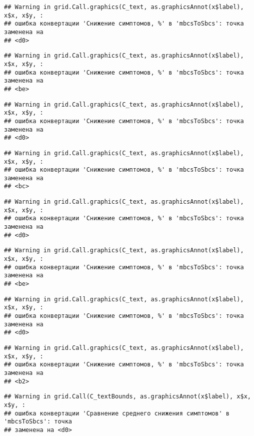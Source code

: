 \documentclass[
]{article}
\begin{document}
\begin{verbatim}
## Warning in grid.Call.graphics(C_text, as.graphicsAnnot(x$label), x$x, x$y, :
## ошибка конвертации 'Снижение симптомов, %' в 'mbcsToSbcs': точка заменена на
## <d0>
\end{verbatim}

\begin{verbatim}
## Warning in grid.Call.graphics(C_text, as.graphicsAnnot(x$label), x$x, x$y, :
## ошибка конвертации 'Снижение симптомов, %' в 'mbcsToSbcs': точка заменена на
## <be>
\end{verbatim}

\begin{verbatim}
## Warning in grid.Call.graphics(C_text, as.graphicsAnnot(x$label), x$x, x$y, :
## ошибка конвертации 'Снижение симптомов, %' в 'mbcsToSbcs': точка заменена на
## <d0>
\end{verbatim}

\begin{verbatim}
## Warning in grid.Call.graphics(C_text, as.graphicsAnnot(x$label), x$x, x$y, :
## ошибка конвертации 'Снижение симптомов, %' в 'mbcsToSbcs': точка заменена на
## <bc>
\end{verbatim}

\begin{verbatim}
## Warning in grid.Call.graphics(C_text, as.graphicsAnnot(x$label), x$x, x$y, :
## ошибка конвертации 'Снижение симптомов, %' в 'mbcsToSbcs': точка заменена на
## <d0>
\end{verbatim}

\begin{verbatim}
## Warning in grid.Call.graphics(C_text, as.graphicsAnnot(x$label), x$x, x$y, :
## ошибка конвертации 'Снижение симптомов, %' в 'mbcsToSbcs': точка заменена на
## <be>
\end{verbatim}

\begin{verbatim}
## Warning in grid.Call.graphics(C_text, as.graphicsAnnot(x$label), x$x, x$y, :
## ошибка конвертации 'Снижение симптомов, %' в 'mbcsToSbcs': точка заменена на
## <d0>
\end{verbatim}

\begin{verbatim}
## Warning in grid.Call.graphics(C_text, as.graphicsAnnot(x$label), x$x, x$y, :
## ошибка конвертации 'Снижение симптомов, %' в 'mbcsToSbcs': точка заменена на
## <b2>
\end{verbatim}

\begin{verbatim}
## Warning in grid.Call(C_textBounds, as.graphicsAnnot(x$label), x$x, x$y, :
## ошибка конвертации 'Сравнение среднего снижения симптомов' в 'mbcsToSbcs': точка
## заменена на <d0>
\end{verbatim}
\end{document}
